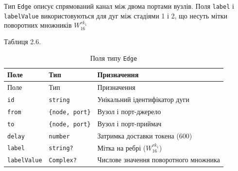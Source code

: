 \documentclass[
]{article}
\begin{document}
Тип \texttt{Edge} описує спрямований канал між двома портами вузлів.
Поля \texttt{label} і \texttt{labelValue} використовуються для дуг між
стадіями 1 і 2, що несуть мітки поворотних множників \(W_{16}^{rk_{1}}\)

Таблиця 2.6.

\begin{longtable}[]{@{}
  >{\raggedright\arraybackslash}p{}
  >{\raggedright\arraybackslash}p{}
  >{\raggedright\arraybackslash}p{}@{}}
\caption{Поля типу \protect\texttt{Edge}}\tabularnewline
\toprule\noalign{}
\begin{minipage}[b]{\linewidth}\raggedright
Поле
\end{minipage} & \begin{minipage}[b]{\linewidth}\raggedright
Тип
\end{minipage} & \begin{minipage}[b]{\linewidth}\raggedright
Призначення
\end{minipage} \\
\midrule\noalign{}
\endfirsthead
\toprule\noalign{}
\begin{minipage}[b]{\linewidth}\raggedright
Поле
\end{minipage} & \begin{minipage}[b]{\linewidth}\raggedright
Тип
\end{minipage} & \begin{minipage}[b]{\linewidth}\raggedright
Призначення
\end{minipage} \\
\midrule\noalign{}
\endhead
\bottomrule\noalign{}
\endlastfoot
\texttt{id} & \texttt{string} & Унікальний ідентифікатор дуги \\
\texttt{from} &
\texttt{\{}\texttt{node}\texttt{,\ }\texttt{port}\texttt{\}} & Вузол і
порт-джерело \\
\texttt{to} &
\texttt{\{}\texttt{node}\texttt{,\ }\texttt{port}\texttt{\}} & Вузол і
порт-приймач \\
\texttt{delay} & \texttt{number} & Затримка доставки токена (600) \\
\texttt{label} & \texttt{string}\texttt{?} & Мітка на ребрі
(\(W_{16}^{rk_{1}}\)) \\
\texttt{labelValue} & \texttt{Complex}\texttt{?} & Числове значення
поворотного множника \\
\end{longtable}
\end{document}
